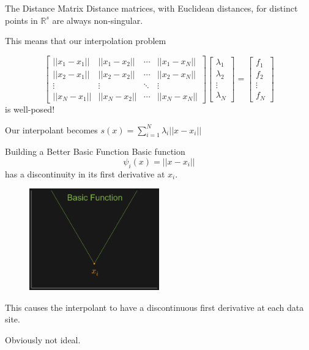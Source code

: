 \documentclass[12pt,t]{beamer}
\newcommand{\subt}[1]{{\footnotesize \color{subtitle} {#1}}}
\begin{document}
\begin{frame}{The Distance Matrix}
Distance matrices, with Euclidean distances, for distinct points in $\mathbb{R}^s$ are always non-singular.
\bigskip

This means that our interpolation problem

\begin{equation*}
\begin{bmatrix}
||x_1-x_1|| & ||x_1-x_2|| & \cdots & ||x_1-x_N||\\
||x_2-x_1|| & ||x_2-x_2||& \cdots & ||x_2-x_N||\\
\vdots & \vdots & \ddots & \vdots\\
||x_N-x_1|| & ||x_N-x_2||& \cdots & ||x_N-x_N||
\end{bmatrix}
\begin{bmatrix}
\lambda_1\\
\lambda_2\\
\vdots\\
\lambda_N
\end{bmatrix}
=
\begin{bmatrix}
f_1\\
f_2\\
\vdots\\
f_N
\end{bmatrix}
\end{equation*}
is well-posed!
\bigskip

Our interpolant becomes 
\subt{$s(x)=\sum_{i=1}^N \lambda_i ||x-x_i|| $}

\note{}
\end{frame}

\begin{frame}{Building a Better Basic Function}
Basic function
\begin{equation*}
\psi_i(x)=||x-x_i||
\end{equation*}
has a discontinuity in its first derivative at $x_i$.

\begin{figure}
\includegraphics[width=0.5\textwidth, keepaspectratio]{fig6.png}
\end{figure}
This causes the interpolant to have a discontinuous first derivative at each data site. 

Obviously not ideal.

\note{}
\end{frame}
\end{document}
